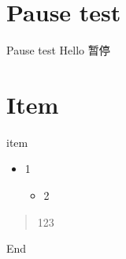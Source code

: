 \documentclass[10pt,aspectratio=169]{beamer} %
\begin{document}
\section{Pause test}
\begin{frame}{Pause test}
\pause
Hello
\pause[3]
暂停
\end{frame}
\section{Item}
\begin{frame}{item}
\begin{itemize}[<+->]
	\item 1\\
	\begin{itemize}
		\item 2
	\end{itemize}
\end{itemize}
\begin{quotation}
	123
\end{quotation}
\end{frame}
\begin{frame}%
	\vfill
	\centering
	{
		\centering \Huge \color{white}End
	}
	\vfill
\end{frame}
\end{document}
